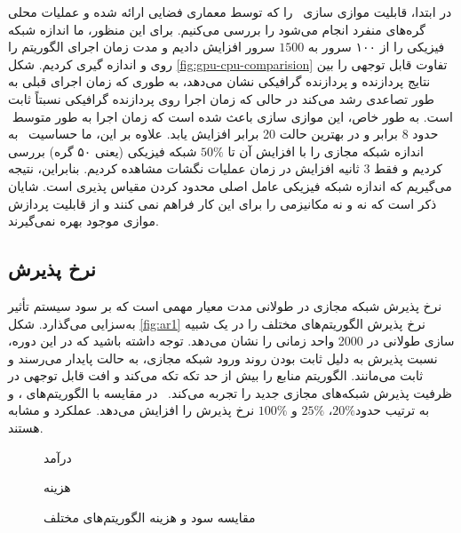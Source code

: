   در ابتدا‌، قابلیت موازی سازی \ourAlg\ را که توسط معماری فضایی  ارائه شده و عملیات محلی گره‌های منفرد  انجام می‌شود را بررسی می‌کنیم. برای این منظور‌، ما اندازه شبکه فیزیکی را از ۱۰۰ سرور به $ 1500 $ سرور افزایش دادیم و مدت زمان اجرای الگوریتم را روی  و  اندازه گیری کردیم. شکل
  \ref{fig:gpu-cpu-comparision}
  تفاوت قابل توجهی را بین نتایج پردازنده و پردازنده گرافیکی نشان می‌دهد‌، به طوری که زمان اجرای قبلی به طور تصاعدی رشد می‌کند در حالی که زمان اجرا  روی پردازنده گرافیکی نسبتاً ثابت است. به طور خاص‌، این موازی سازی باعث شده است که زمان اجرا به طور متوسط ​​حدود 8 برابر و در بهترین حالت 20 برابر افزایش یابد. علاوه بر این‌، ما حساسیت \ourAlg\ به اندازه شبکه مجازی را با افزایش آن تا $50\%$ شبکه فیزیکی (یعنی ۵۰ گره) بررسی کردیم و فقط 3 ثانیه افزایش در زمان عملیات نگشات مشاهده کردیم. 
  بنابراین‌، نتیجه می‌گیریم که اندازه شبکه فیزیکی عامل اصلی محدود کردن مقیاس پذیری است. شایان ذکر است که نه  و نه  مکانیزمی را برای این کار فراهم نمی کنند و از قابلیت پردازش موازی موجود بهره نمی‌گیرند. 
  
  \subsection{نرخ پذیرش}
  
  نرخ پذیرش شبکه مجازی در  طولانی مدت معیار مهمی است که بر سود سیستم تأثیر به‌سزایی می‌گذارد. شکل 
  \ref {fig:ar1}
   نرخ پذیرش الگوریتم‌های مختلف را در یک شبیه سازی طولانی در 2000  واحد زمانی را نشان می‌دهد. توجه داشته باشید که در این دوره‌، نسبت پذیرش به دلیل ثابت بودن روند ورود شبکه مجازی‌، به حالت پایدار می‌رسند و ثابت می‌مانند. الگوریتم  منابع را بیش از حد تکه تکه می‌کند و افت قابل توجهی در ظرفیت پذیرش شبکه‌های مجازی جدید را تجربه می‌کند. \ourAlg\ در مقایسه با الگوریتم‌های ‌،  و  به ترتیب حدود$20\%$، $25\% $ و $ 100\% $ نرخ پذیرش را  افزایش می‌دهد. عملکرد  و  مشابه هستند.
   
   
   \begin{figure}[t]
   	\centering
   	\begin{minipage}{0.43\linewidth}
   		\centering
   		\caption{درآمد}
   		\label{fig:rev-load1000}
   	\end{minipage}
   	\hfil
   	\begin{minipage}{0.43\linewidth}
   		\centering
   		\caption{هزینه}
   		\label{fig:cost-load1000}
   	\end{minipage}
   	\caption{مقایسه سود و هزینه الگوریتم‌های مختلف}
   	\label{fig:rev-cost1}
   \end{figure}

